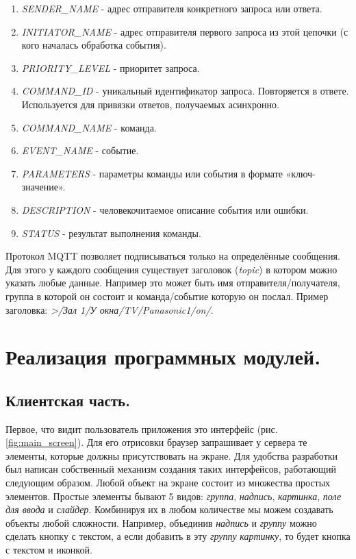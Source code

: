 \begin{enumerate}
    \item \textit{SENDER\_NAME} - адрес отправителя конкретного запроса или ответа.
    \item \textit{INITIATOR\_NAME} - адрес отправителя первого запроса из этой цепочки (с кого началась обработка события).
    \item \textit{PRIORITY\_LEVEL} - приоритет запроса.
    \item \textit{COMMAND\_ID} - уникальный идентификатор запроса. Повторяется в ответе.
    Используется для привязки ответов, получаемых асинхронно.
    \item \textit{COMMAND\_NAME} - команда.
    \item \textit{EVENT\_NAME} - событие.
    \item \textit{PARAMETERS} - параметры команды или события в формате «ключ-значение».
    \item \textit{DESCRIPTION} - человекочитаемое описание события или ошибки.
    \item \textit{STATUS} - результат выполнения команды.
\end{enumerate}

\noindent Протокол MQTT позволяет подписываться только на определённые сообщения. Для этого у каждого сообщения существует
заголовок (\textit{topic}) в котором можно указать любые данные. Например это может быть имя отправителя/получателя,
группа в которой он состоит и команда/событие которую он послал. Пример заголовка: \textit{>/Зал 1/У окна/TV/Panasonic1/on/}.

\clearpage

\section{Реализация программных модулей.}

\subsection{Клиентская часть.}

Первое, что видит пользователь приложения это интерфейс (рис. \ref{fig:main_screen}). Для его отрисовки браузер запрашивает
у сервера те элементы, которые должны присутствовать на экране. Для удобства разработки был написан собственный механизм
создания таких интерфейсов, работающий следующим образом. Любой объект на экране состоит из множества простых элементов.
Простые элементы бывают 5 видов: \textit{группа}, \textit{надпись}, \textit{картинка}, \textit{поле для ввода} и
\textit{слайдер}. Комбинируя их в любом количестве мы можем создавать объекты любой сложности. Например, объединив
\textit{надпись} и \textit{группу} можно сделать кнопку с текстом, а если добавить в эту \textit{группу} \textit{картинку},
то будет кнопка с текстом и иконкой.

